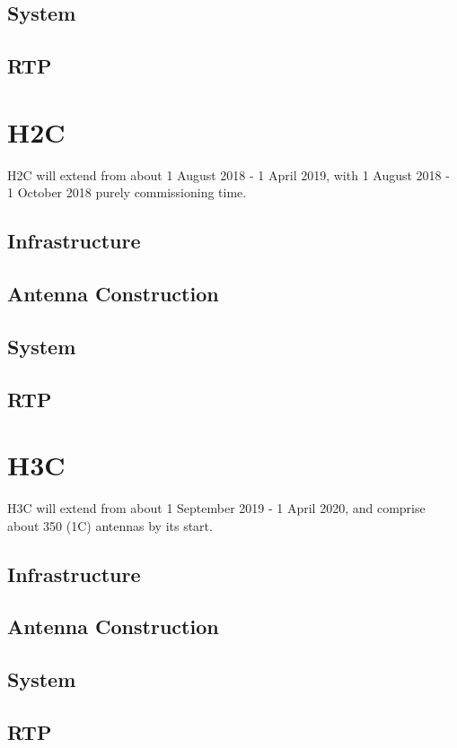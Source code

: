 \documentclass{article}
\begin{document}
\subsection{System}

\subsection{RTP}


\section{H2C}
H2C will extend from about 1 August 2018 - 1 April 2019, with 1 August 2018 - 1 October 2018 purely commissioning time.

\subsection{Infrastructure}

\subsection{Antenna Construction}

\subsection{System}

\subsection{RTP}

\section{H3C}
H3C will extend from about 1 September 2019 - 1 April 2020, and comprise about 350 (1C) antennas by its start.

\subsection{Infrastructure}

\subsection{Antenna Construction}

\subsection{System}

\subsection{RTP}
\end{document}
